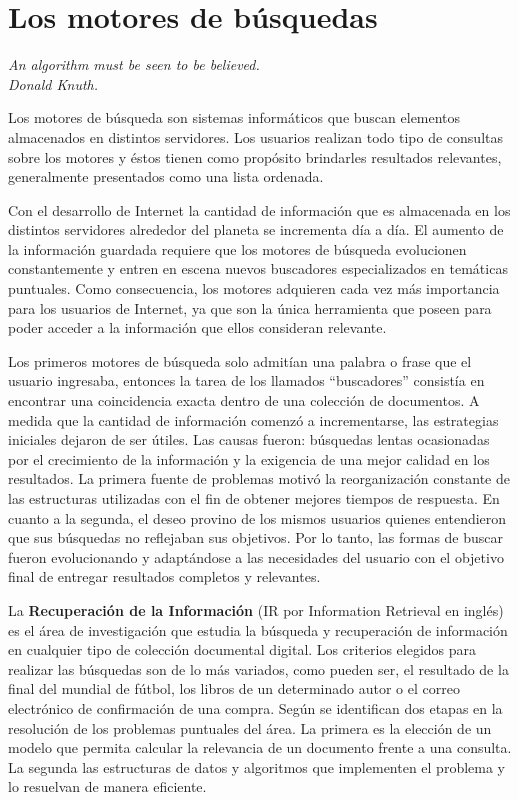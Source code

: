 \section{Los motores de búsquedas}
{\begin{small}%
\begin{flushright}%
\it An algorithm must be seen to be believed.\\Donald Knuth.
\end{flushright}%
\end{small}%
\vspace{.5cm}}
Los motores de búsqueda son sistemas informáticos que buscan elementos almacenados en distintos servidores. Los usuarios realizan todo tipo de consultas sobre los motores y éstos tienen como propósito brindarles resultados relevantes, generalmente presentados como una lista ordenada.

Con el desarrollo de Internet la cantidad de información que es almacenada en los distintos servidores alrededor del planeta se incrementa día a día. El aumento de la información guardada requiere que los motores de búsqueda evolucionen constantemente y entren en escena nuevos buscadores especializados en temáticas puntuales. Como consecuencia, los motores adquieren cada vez más importancia para los usuarios de Internet, ya que son la única herramienta que poseen para poder acceder a la información que ellos consideran relevante.

Los primeros motores de búsqueda solo admitían una palabra o frase que el usuario ingresaba, entonces la tarea de los llamados ``buscadores'' consistía en encontrar una coincidencia exacta dentro de una colección de documentos. A medida que la cantidad de información comenzó a incrementarse, las estrategias iniciales dejaron de ser útiles. Las causas fueron: búsquedas lentas ocasionadas por el crecimiento de la información y la exigencia de una mejor calidad en los resultados. La primera fuente de problemas motivó la reorganización constante de las estructuras utilizadas con el fin de obtener mejores tiempos de respuesta. En cuanto a la segunda, el deseo provino de los mismos usuarios quienes entendieron que sus búsquedas no reflejaban sus objetivos. Por lo tanto, las formas de buscar fueron evolucionando y adaptándose a las necesidades del usuario con el objetivo final de entregar resultados completos y relevantes.

La \textbf{Recuperación de la Información} (IR por Information Retrieval en inglés) \cite{Baeza-Yates:1999:MIR:553876,Manning:2008:IIR:1394399,Zobel:2006:IFT:1132956.1132959} es el área de investigación que estudia la búsqueda y recuperación de información en cualquier tipo de colección documental digital. Los criterios elegidos para realizar las búsquedas son de lo más variados, como pueden ser, el resultado de la final del mundial de fútbol, los libros de un determinado autor o el correo electrónico de confirmación de una compra. Según \cite{Baeza-Yates:1999:MIR:553876} se identifican dos etapas en la resolución de los problemas puntuales del área. La primera es la elección de un modelo que permita calcular la relevancia de un documento frente a una consulta. La segunda las estructuras de datos y algoritmos que implementen el problema y lo resuelvan de manera eficiente.

